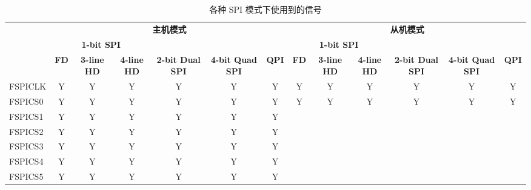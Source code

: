 \documentclass[main\_\_CN.tex]{subfiles}
\begin{document}
\begin{landscape}
\begin{table}[H]
    \centering
    \caption{各种 SPI 模式下使用到的信号}
    \label{tab:spi-signals-various-spi-modes}

    \begin{threeparttable}
    \begin{tabular}{ |p{2.0cm} |c|c|c|c|c|c|c|c|c|c|c|c| }
    \hline
        \rowcolor{lightgray}
        & \multicolumn{6}{c|}{\textbf{主机模式}} & \multicolumn{6}{c|}{\textbf{从机模式}} \\\cline{2-13}
        \rowcolor{lightgray}
        & \multicolumn{3}{c|}{\textbf{1-bit SPI}} & & & & \multicolumn{3}{c|}{\textbf{1-bit SPI}} & & & \\ \cline{2-4} \cline{8-10}
        \rowcolor{lightgray}
        \multirow{-3}{*}{\textbf{FSPI 总线信号}} & \textbf{FD\tnote{1}} & \textbf{3-line HD\tnote{2}} & \textbf{4-line HD} & \multirow{-2}{*}{\textbf{2-bit Dual SPI}} & \multirow{-2}{*}{\textbf{4-bit Quad SPI}} & \multirow{-2}{*}{\textbf{QPI}} & \textbf{FD} & \textbf{3-line HD} & \textbf{4-line HD} & \multirow{-2}{*}{\textbf{2-bit Dual SPI}} & \multirow{-2}{*}{\textbf{4-bit Quad SPI}} & \multirow{-2}{*}{\textbf{QPI}} \\ \hline
FSPICLK                  & Y       & Y       & Y       & Y       & Y       & Y      & Y       & Y      & Y       & Y       & Y       & Y      \\ \hline
FSPICS0                  & Y       & Y       & Y       & Y       & Y       & Y      & Y       & Y      & Y       & Y       & Y       & Y      \\ \hline
FSPICS1                  & Y       & Y       & Y       & Y       & Y       & Y      &         &        &         &         &         &        \\ \hline
FSPICS2                  & Y       & Y       & Y       & Y       & Y       & Y      &         &        &         &         &         &        \\ \hline
FSPICS3                  & Y       & Y       & Y       & Y       & Y       & Y      &         &        &         &         &         &        \\ \hline
FSPICS4                  & Y       & Y       & Y       & Y       & Y       & Y      &         &        &         &         &         &        \\ \hline
FSPICS5                  & Y       & Y       & Y       & Y       & Y       & Y      &         &        &         &         &         &        \\ \hline

\end{tabular}
\end{threeparttable}
\end{table}
\end{landscape}
\end{document}
